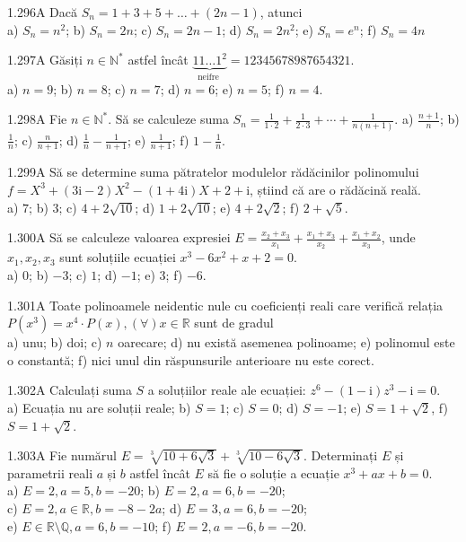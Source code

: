 \documentclass[11pt]{article}
\begin{document}
1.296A Dacă $S_{n}=1+3+5+\ldots+(2 n-1)$, atunci\\ a) $S_{n}=n^{2}$; b) $S_{n}=2 n$; c) $S_{n}=2 n-1$; d) $S_{n}=2 n^{2}$; e) $S_{n}=e^{n}$; f) $S_{n}=4 n$

1.297A Găsiți $n \in \mathbb{N}^{*}$ astfel încât $\underbrace{11 \ldots 1^{2}}_{\text {neifre }}=12345678987654321$.\\ a) $n=9$; b) $n=8$; c) $n=7$; d) $n=6$; e) $n=5$; f) $n=4$.

1.298A Fie $n \in \mathbb{N}^{*}$. Să se calculeze suma $S_{n}=\frac{1}{1 \cdot 2}+\frac{1}{2 \cdot 3}+\cdots+\frac{1}{n(n+1)}$. a) $\frac{n+1}{n}$; b) $\frac{1}{n}$; c) $\frac{n}{n+1}$; d) $\frac{1}{n}-\frac{1}{n+1}$; e) $\frac{1}{n+1}$; f) $1-\frac{1}{n}$. 

1.299A Să se determine suma pătratelor modulelor rădăcinilor polinomului $f=X^{3}+(3 \mathrm{i}-2) X^{2}-(1+4 \mathrm{i}) X+2+\mathrm{i}$, știind că are o rădăcină reală.\\ a) $7$; b) $3$; c) $4+2 \sqrt{10}$; d) $1+2 \sqrt{10}$; e) $4+2 \sqrt{2}$; f) $2+\sqrt{5}$.

1.300A Să se calculeze valoarea expresiei $E=\frac{x_{2}+x_{3}}{x_{1}}+\frac{x_{1}+x_{3}}{x_{2}}+\frac{x_{1}+x_{2}}{x_{3}}$, unde $x_{1}, x_{2}, x_{3}$ sunt soluțiile ecuației $x^{3}-6 x^{2}+x+2=0$.\\ a) $0$; b) $-3$; c) $1$; d) $-1$; e) $3$; f) $-6$.

1.301A Toate polinoamele neidentic nule cu coeficienți reali care verifică relația $P\left(x^{3}\right)=x^{4} \cdot P(x),(\forall) x \in \mathbb{R}$ sunt de gradul\\ a) unu; b) doi; c) $n$ oarecare; d) nu există asemenea polinoame; e) polinomul este o constantă; f) nici unul din răspunsurile anterioare nu este corect.

1.302A Calculați suma $S$ a soluțiilor reale ale ecuației: $z^{6}-(1-\mathrm{i}) z^{3}-\mathrm{i}=0$.\\ a) Ecuația nu are soluții reale; b) $S=1$; c) $S=0$; d) $S=-1$; e) $S=1+\sqrt{2}$, f) $S=1+\sqrt{2}$.

1.303A Fie numărul $E=\sqrt[3]{10+6 \sqrt{3}}+\sqrt[3]{10-6 \sqrt{3}}$. Determinați $E$ și parametrii reali $a$ și $b$ astfel încât $E$ să fie o soluție a ecuație $x^{3}+a x+b=0$.\\ a) $E=2, a=5, b=-20$; b) $E=2, a=6, b=-20$;\\ c) $E=2, a \in \mathbb{R}, b=-8-2 a$; d) $E=3, a=6, b=-20$;\\ e) $E \in \mathbb{R} \setminus \mathbb{Q}, a=6, b=-10$; f) $E=2, a=-6, b=-20$.
\end{document}
